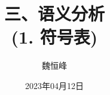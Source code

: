 \documentclass[]{beamer}
\title[语义分析]{三、语义分析\\ (1. 符号表)}
\author[魏恒峰]{\large 魏恒峰}
\institute{hfwei@nju.edu.cn}
\date{2023年04月12日}
\begin{document}
\maketitle


\thankyou{}

\end{document}
